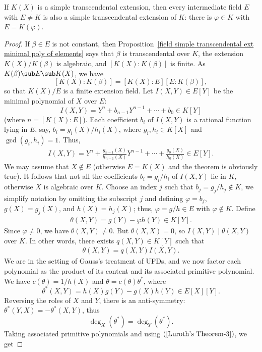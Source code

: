 \begin{theorem}
If $K(X)$ is a simple transcendental extension, then every intermediate field $E$ with $E\neq K$ is also a simple transcendental extension of $K$: there is $\varphi\in K$ with $E=K(\varphi)$.
\end{theorem}
\begin{proof}
If $\beta\in E$ is not constant, then Proposition~\ref{field simple transcendental ext minimal poly of elements} says that $\beta$ is transcendental over $K$, the extension $K(X)/K(\beta)$ is algebraic, and $[K(X):K(\beta)]$ is finite. As $K(\beta)\sub E\sub K(X)$, we have
\[[K(X):K(\beta)]=[K(X):E][E:K(\beta)],\]
so that $K(X)/E$ is a finite extension field. Let $I(X,Y)\in E[Y]$ be the minimal polynomial of $X$ over $E$:
\[I(X,Y)=Y^n+b_{n-1}Y^{n-1}+\cdots+b_0\in K[Y]\]
(where $n=[K(X):E]$). Each coefficient $b_i$ of $I(X,Y)$ is a rational function lying in $E$, say, $b_i=g_i(X)/h_i(X)$, where $g_i,h_i\in K[X]$ and $\gcd(g_i,h_i)=1$. Thus,
\begin{align}\label{Luroth's Theorem-1}
I(X,Y)=Y^n+\frac{g_{n-1}(X)}{h_{n-1}(X)}Y^{n-1}+\cdots+\frac{g_0(X)}{h_0(X)}\in E[Y].
\end{align}
We may assume that $X\notin E$ (otherwise $E=K(X)$ and the theorem is obviously true). It follows that not all the coefficients $b_i=g_i/h_i$ of $I(X,Y)$ lie in $K$, otherwise $X$ is algebraic over $K$. Choose an index $j$ such that $b_j=g_j/h_j\notin K$, we simplify notation by omitting the subscript $j$ and defining $\varphi=b_j$, $g(X)=g_j(X)$, and $h(X)=h_j(X)$; thus, $\varphi=g/h\in E$ with $\varphi\notin K$. Define
\begin{align}\label{Luroth's Theorem-2}
\theta(X,Y)=g(Y)-\varphi h(Y)\in K[Y].
\end{align}
Since $\varphi\neq 0$, we have $\theta(X,Y)\neq 0$. But $\theta(X,X)=0$, so $I(X,Y)\mid\theta(X,Y)$ over $K$. In other words, there exists $q(X,Y)\in K[Y]$ such that
\begin{align}\label{Luroth's Theorem-3}
\theta(X,Y)=q(X,Y)I(X,Y).
\end{align}
We are in the setting of Gauss's treatment of UFDs, and we now factor each polynomial as the product of its content and its associated primitive polynomial. We have $c(\theta)=1/h(X)$ and $\theta=c(\theta)\theta^*$, where
\[\theta^*(X,Y)=h(X)g(Y)-g(X)h(Y)\in E[X][Y].\]
Reversing the roles of $X$ and $Y$, there is an anti-symmetry: $\theta^*(Y,X)=-\theta^*(X,Y)$, thus
\[\deg_X(\theta^*)=\deg_Y(\theta^*).\]
Taking associated primitive polynomials and using $(\ref{Luroth's Theorem-3})$, we get

\end{proof}
